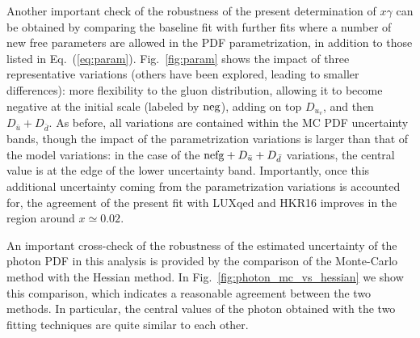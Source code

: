 Another important check of the robustness of the present determination of
$x\gamma$ can be obtained by comparing the baseline fit with further
fits where a number of new free parameters are allowed in the PDF
parametrization, in addition to those listed in Eq.~(\ref{eq:param}).
%
Fig.~\ref{fig:param} shows the impact of three representative
variations (others have been explored, leading to smaller
differences): more flexibility to the gluon distribution, allowing it
to become negative at the initial scale (labeled by ${\rm neg}$), adding on top $D_{u_v}$,
and then $D_{\bar{u}}+D_{\bar{d}}$.
%
As before, all variations are contained within the MC PDF uncertainty
bands, though the impact of the parametrization variations is larger
than that of the model variations: in the case of the
${\rm nefg}+D_{\bar{u}}+D_{\bar{d}}$ variations, the central value is
at the edge of the lower uncertainty band.
%
Importantly, once this additional uncertainty coming from the
parametrization variations is accounted for, the agreement of the present fit
with LUXqed and HKR16 improves in the region around $x\simeq 0.02$.

An important cross-check of the robustness of the estimated
uncertainty of the photon PDF in this analysis is provided by the
comparison of the Monte-Carlo method with the Hessian method.
%
In Fig.~\ref{fig:photon_mc_vs_hessian} we show this comparison, which
indicates a reasonable agreement between the two methods.
%
In particular, the central values of the photon obtained with the two
fitting techniques are quite similar to each other.

